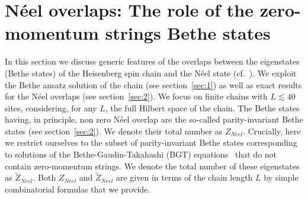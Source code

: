 \documentclass[11pt]{iopart}
\begin{document}
\section{N\'eel overlaps: The role of the zero-momentum strings Bethe states}
\label{sec:5}

In this section we discuss generic features of the overlaps between the 
eigenstates (Bethe states) of the Heisenberg spin chain and the N\'eel state 
(cf.~). We exploit the Bethe ansatz solution of the chain (see 
section~\ref{sec:1}) as well as exact results for the N\'eel overlaps (see 
section~\ref{sec:2}). We focus on finite chains with $L\lesssim 40$ sites, 
considering, for any $L$, the full Hilbert space of the chain. 
The Bethe states having, in principle, non zero N\'eel overlap are the 
so-called parity-invariant Bethe states (see section~\ref{sec:2}). We 
denote their total number as $Z_{Neel}$. Crucially, here we restrict 
ourselves to the subset of parity-invariant Bethe states corresponding 
to solutions of the Bethe-Gaudin-Takahashi (BGT) equations~ 
that do not contain zero-momentum strings. We denote the total number of 
these eigenstates as $\widetilde Z_{Neel}$. Both $Z_{Neel}$ and $\widetilde 
Z_{Neel}$ are given in terms of the chain length $L$ by simple combinatorial 
formulas that we provide. 
\end{document}
